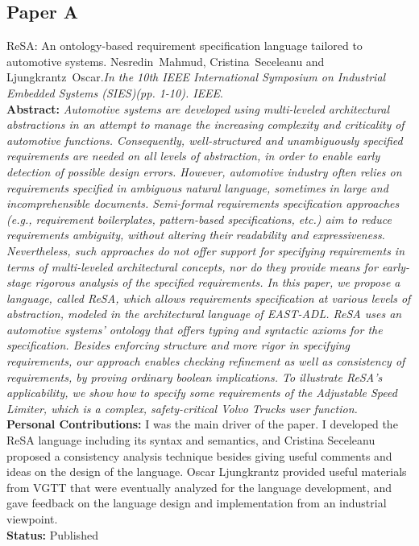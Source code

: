 \subsection*{Paper A}
ReSA: An ontology-based requirement specification language tailored to automotive systems. Nesredin~Mahmud, Cristina~Seceleanu and Ljungkrantz~Oscar.\textit{In the 10th IEEE International Symposium on Industrial Embedded Systems (SIES)(pp. 1-10). IEEE}.\label{lbl_resa}\\[6pt]
\textbf{Abstract:} \textit{Automotive systems are developed using multi-leveled architectural abstractions in an attempt to manage the increasing complexity and criticality of automotive functions. Consequently, well-structured and unambiguously specified requirements are needed on all levels of abstraction, in order to enable early detection of possible design errors. However, automotive industry often relies on requirements specified in ambiguous natural language, sometimes in large and incomprehensible documents. Semi-formal requirements specification approaches (e.g., requirement boilerplates, pattern-based specifications, etc.) aim to reduce requirements ambiguity, without altering their readability and expressiveness. Nevertheless, such approaches do not offer support for specifying requirements in terms of multi-leveled architectural concepts, nor do they provide means for early-stage rigorous analysis of the specified requirements. In this paper, we propose a language, called ReSA, which allows requirements specification at various levels of abstraction, modeled in the architectural language of EAST-ADL. ReSA uses an automotive systems' ontology that offers typing and syntactic axioms for the specification. Besides enforcing structure and more rigor in specifying requirements, our approach enables checking refinement as well as consistency of requirements, by proving ordinary boolean implications. To illustrate ReSA's applicability, we show how to specify some requirements of the Adjustable Speed Limiter, which is a complex, safety-critical Volvo Trucks user function.}\\[6pt]
\textbf{Personal Contributions: }I was the main driver of the paper. I developed the ReSA language including its syntax and semantics, and Cristina Seceleanu proposed a consistency analysis technique besides giving useful comments and ideas on the design of the language. Oscar Ljungkrantz provided useful materials from VGTT that were eventually analyzed for the language development, and gave feedback on the language design and implementation from an industrial viewpoint.\\
\textbf{Status:} Published

